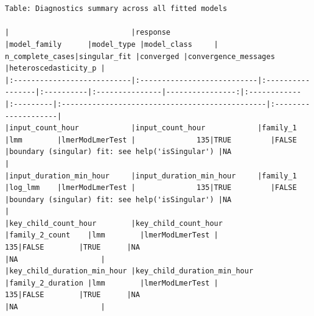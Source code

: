 \documentclass[
  letterpaper,
  DIV=11,
  numbers=noendperiod]{scrartcl}
\begin{document}
\begin{verbatim}


Table: Diagnostics summary across all fitted models

|                            |response                    |model_family      |model_type |model_class     | n_complete_cases|singular_fit |converged |convergence_messages                            |heteroscedasticity_p |
|:---------------------------|:---------------------------|:-----------------|:----------|:---------------|----------------:|:------------|:---------|:-----------------------------------------------|:--------------------|
|input_count_hour            |input_count_hour            |family_1          |lmm        |lmerModLmerTest |              135|TRUE         |FALSE     |boundary (singular) fit: see help('isSingular') |NA                   |
|input_duration_min_hour     |input_duration_min_hour     |family_1          |log_lmm    |lmerModLmerTest |              135|TRUE         |FALSE     |boundary (singular) fit: see help('isSingular') |NA                   |
|key_child_count_hour        |key_child_count_hour        |family_2_count    |lmm        |lmerModLmerTest |              135|FALSE        |TRUE      |NA                                              |NA                   |
|key_child_duration_min_hour |key_child_duration_min_hour |family_2_duration |lmm        |lmerModLmerTest |              135|FALSE        |TRUE      |NA                                              |NA                   |
\end{verbatim}
\end{document}
